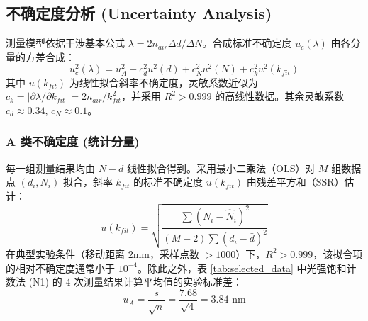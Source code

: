 \documentclass[twocolumn, a4paper, 10pt]{article}
\begin{document}
\subsection{不确定度分析 (Uncertainty Analysis)}
测量模型依据干涉基本公式 $\lambda = 2 n_{air} \Delta d / \Delta N$。合成标准不确定度 $u_c(\lambda)$ 由各分量的方差合成：
\begin{equation}
    u_c^2(\lambda) = u_A^2 + c_d^2 u^2(d) + c_N^2 u^2(N) + c_k^2 u^2(k_{fit})
\end{equation}
其中 $u(k_{fit})$ 为线性拟合斜率不确定度，灵敏系数近似为 $c_k = \left|\partial \lambda/\partial k_{fit}\right| = 2 n_{air}/k_{fit}^2$，并采用 $R^2>0.999$ 的高线性数据。其余灵敏系数 $c_d \approx 0.34$, $c_N \approx 0.1$。

\subsubsection{A 类不确定度 (统计分量)}
每一组测量结果均由 $N-d$ 线性拟合得到。采用最小二乘法（OLS）对 $M$ 组数据点 $(d_i, N_i)$ 拟合，斜率 $k_{fit}$ 的标准不确定度 $u(k_{fit})$ 由残差平方和（SSR）估计：
\begin{equation}
    u(k_{fit}) = \sqrt{\frac{\sum (N_i - \hat{N}_i)^2}{(M-2) \sum (d_i - \bar{d})^2}}
\end{equation}
在典型实验条件（移动距离 $2\text{mm}$，采样点数 $>1000$）下，$R^2>0.999$，该拟合项的相对不确定度通常小于 $10^{-4}$。除此之外，表 \ref{tab:selected_data} 中光强饱和计数法 (N1) 的 4 次测量结果计算平均值的实验标准差：
\begin{equation}
    u_A = \frac{s}{\sqrt{n}} = \frac{7.68}{\sqrt{4}} = 3.84 \text{ nm}
\end{equation}
\end{document}
